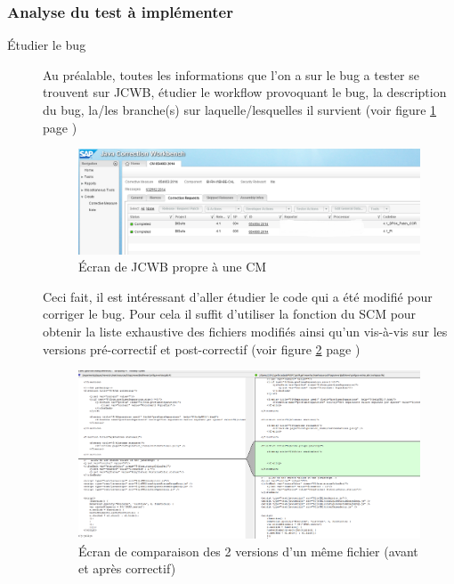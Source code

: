 \subsubsection{Analyse du test à implémenter}
\begin{description}
	\item[\'{E}tudier le bug] Au préalable, toutes les informations que l'on a sur le bug a tester se trouvent sur JCWB, étudier le workflow provoquant le bug, la description du bug, la/les branche(s) sur laquelle/lesquelles il survient (voir figure \ref{figure:JCWB-CRs} page \pageref{figure:JCWB-CRs})\\
	\begin{figure}[!h]
  \centering
      \includegraphics[width=\textwidth]{images/JCWB-CRs.png}
  \caption{\'{E}cran de JCWB propre à une CM}
	\label{figure:JCWB-CRs}
\end{figure}
Ceci fait, il est intéressant d'aller étudier le code qui a été modifié pour corriger le bug. Pour cela il suffit d'utiliser la fonction  du SCM pour obtenir la liste exhaustive des fichiers modifiés ainsi qu'un vis-à-vis sur les versions pré-correctif et post-correctif (voir figure \ref{figure:diffAgainst} page \pageref{figure:diffAgainst})\\
	\begin{figure}[!h]
  \centering
      \includegraphics[width=\textwidth]{images/diffAgainst.png}
  \caption{\'{E}cran de comparaison des 2 versions d'un m\^{e}me fichier (avant et après correctif)}
	\label{figure:diffAgainst}
\end{figure}


\end{description}
